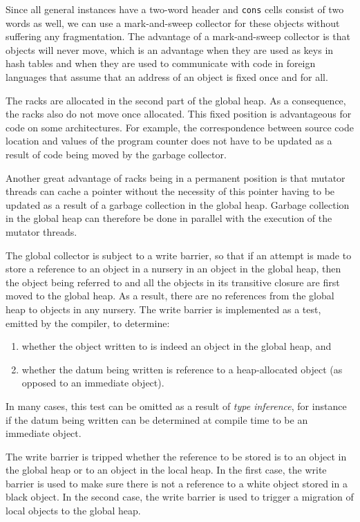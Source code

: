 Since all general instances have a two-word header and \texttt{cons}
cells consist of two words as well, we can use a mark-and-sweep
collector for these objects without suffering any fragmentation.  The
advantage of a mark-and-sweep collector is that objects will never
move, which is an advantage when they are used as keys in hash tables
and when they are used to communicate with code in foreign languages
that assume that an address of an object is fixed once and for all.

The racks are allocated in the second part of the global heap.  As a
consequence, the racks also do not move once allocated.  This
fixed position is advantageous for code on some architectures.  For
example, the correspondence between source code location and values of
the program counter does not have to be updated as a result of code
being moved by the garbage collector.

Another great advantage of racks being in a permanent position is that
mutator threads can cache a pointer without the necessity of this
pointer having to be updated as a result of a garbage collection in
the global heap.  Garbage collection in the global heap can therefore
be done in parallel with the execution of the mutator threads.

The global collector is subject to a write barrier, so that if an
attempt is made to store a reference to an object in a nursery in an
object in the global heap, then the object being referred to and all
the objects in its transitive closure are first moved to the global
heap.  As a result, there are no references from the global heap to
objects in any nursery.  The write barrier is implemented as a test,
emitted by the compiler, to determine:

\begin{enumerate}
\item whether the object written to is indeed an object in the global
  heap, and
\item whether the datum being written is reference to a heap-allocated
  object (as opposed to an immediate object).
\end{enumerate}

In many cases, this test can be omitted as a result of \emph{type
  inference}, for instance if the datum being written can be
determined at compile time to be an immediate object.

The write barrier is tripped whether the reference to be stored is to
an object in the global heap or to an object in the local heap.  In
the first case, the write barrier is used to make sure there is not a
reference to a white object stored in a black object.  In the second
case, the write barrier is used to trigger a migration of local
objects to the global heap.

